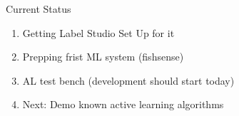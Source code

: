 \begin{frame}{Current Status}
    \begin{enumerate}
        \item Getting Label Studio Set Up for it
        \item Prepping frist ML system (fishsense)
        \item AL test bench (development should start today)
        \item Next: Demo known active learning algorithms
    \end{enumerate}
\end{frame}
